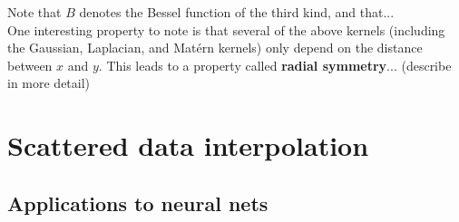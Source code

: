 \documentclass{article}
\theoremstyle{definition}
\theoremstyle{remark}
\begin{document}
Note that $B$ denotes the Bessel function of the third kind, and that... \\

One interesting property to note is that several of the above kernels (including the Gaussian, Laplacian, and Matérn kernels) only depend on the distance between $x$ and $y$. This leads to a property called \textbf{radial symmetry}...  (describe in more detail)\\

\section{Scattered data interpolation} 

\subsection{Applications to neural nets} 
\end{document}
